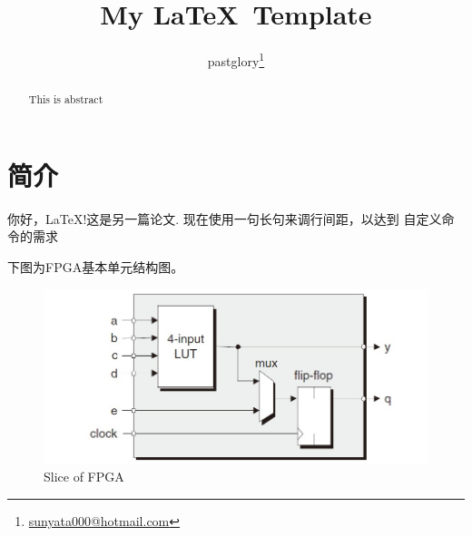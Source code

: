 \documentclass[zh]{pgreport}
\title {My \LaTeX\ Template}
\author{pastglory\thanks{\href{mailto:sunyata000@hotmail.com}{sunyata000@hotmail.com}}}
\date{}
\begin{document}
\maketitle

\begin{abstract}
This is abstract
\end{abstract}

\section{简介}
你好，\LaTeX!这是另一篇论文\cite{sadi2017design}. 现在使用一句长句来调行间距，以达到
自定义命令的需求

下图为FPGA基本单元结构图。
\begin{figure}[H] %
    \centering
    \includegraphics{img/FPGA.jpg}
    \caption{Slice of FPGA} %
    \label{图1} %
\end{figure}


\end{document}
